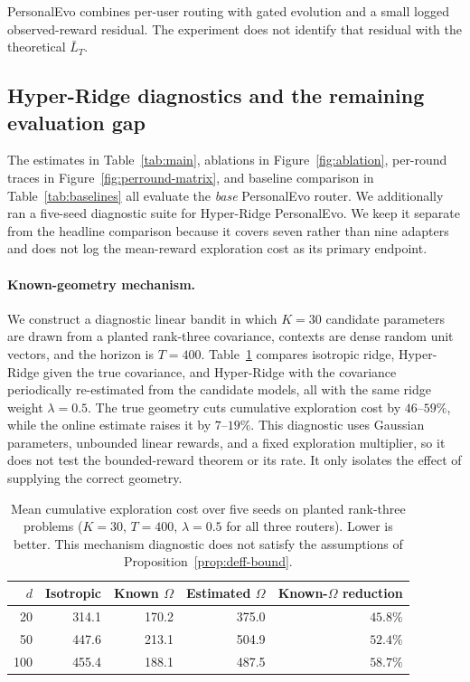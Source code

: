 \documentclass{article} %
\begin{document}
PersonalEvo combines per-user routing with gated evolution and a small logged observed-reward residual. The experiment does not identify that residual with the theoretical \(\bar L_T\).

\subsection{Hyper-Ridge diagnostics and the remaining evaluation gap}
\label{sec:exp-hyper-ridge-plan}

The estimates in Table~\ref{tab:main}, ablations in
Figure~\ref{fig:ablation}, per-round traces in
Figure~\ref{fig:perround-matrix}, and baseline comparison in
Table~\ref{tab:baselines} all evaluate the \emph{base} PersonalEvo router. We
additionally ran a five-seed diagnostic suite for Hyper-Ridge PersonalEvo. We
keep it separate from the headline comparison because it covers seven rather
than nine adapters and does not log the mean-reward exploration cost as its
primary endpoint.

\paragraph{Known-geometry mechanism.}
We construct a diagnostic linear bandit in which $K=30$ candidate parameters are drawn from a planted rank-three covariance, contexts are dense random unit vectors, and the horizon is $T=400$. Table~\ref{tab:hyper-diagnostic} compares isotropic ridge, Hyper-Ridge given the true covariance, and Hyper-Ridge with the covariance periodically re-estimated from the candidate models, all with the same ridge weight $\lambda=0.5$. The true geometry cuts cumulative exploration cost by $46$--$59\%$, while the online estimate raises it by $7$--$19\%$. This diagnostic uses Gaussian parameters, unbounded linear rewards, and a fixed exploration multiplier, so it does not test the bounded-reward theorem or its rate. It only isolates the effect of supplying the correct geometry.

\begin{table}[H]
\centering
\small
\begin{tabular}{rrrrr}
\toprule
$d$ & Isotropic & Known $\Omega$ & Estimated $\Omega$ & Known-$\Omega$ reduction \\
\midrule
20  & 314.1 & 170.2 & 375.0 & $45.8\%$ \\
50  & 447.6 & 213.1 & 504.9 & $52.4\%$ \\
100 & 455.4 & 188.1 & 487.5 & $58.7\%$ \\
\bottomrule
\end{tabular}
\caption{Mean cumulative exploration cost over five seeds on planted rank-three problems ($K=30$, $T=400$, $\lambda=0.5$ for all three routers). Lower is better. This mechanism diagnostic does not satisfy the assumptions of Proposition~\ref{prop:deff-bound}.}
\label{tab:hyper-diagnostic}
\end{table}
\end{document}
